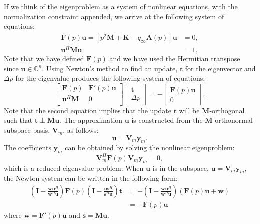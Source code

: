 \documentclass[12pt]{article}
\newcommand{\f}{\frac}
\newcommand{\mb}{\mathbf}
\begin{document}
If we think of the eigenproblem as a system of nonlinear equations,
with the normalization constraint appended, we arrive at the following
system of equations:
%
\begin{equation*}
  \begin{aligned}
    \mb{F}(p)\mb{u} = 
    \left[ p^{2} \mb{M} + \mb{K} - q_{\infty} \mb{A}(p) \right] \mb{u} & = 0, \\
    \mb{u}^{H} \mb{M} \mb{u} & = 1.
  \end{aligned}
\end{equation*}
Note that we have defined $\mb{F}(p)$ and we have used the Hermitian
transpose since $\mb{u} \in \mathbb{C}^{n}$. Using Newton's method
to find an update, $\mb{t}$ for the eigenvector and $\Delta p$ for
the eigenvalue produces the following system of equations:
%
\begin{equation*}
  \begin{bmatrix} 
    \mb{F}(p) & \mb{F}'(p)\mb{u} \\
    \mb{u}^{H}\mb{M} & 0  \\
  \end{bmatrix}
  \begin{bmatrix}
    \mb{t} \\
    \Delta p
  \end{bmatrix}
  = -
  \begin{bmatrix}
    \mb{F}(p)\mb{u} \\
    0
  \end{bmatrix}.
\end{equation*}
Note that the second equation implies that the update $\mb{t}$ will be
$\mb{M}$-orthogonal such that $\mb{t} \perp \mb{M} \mb{u}$.  The
approximation $\mb{u}$ is constructed from the $\mb{M}$-orthonormal
subspace basis, $\mb{V}_{m}$, as follows:
%
\begin{equation*}
  \mb{u} = \mb{V}_{m} \mb{y}_{m}.
\end{equation*}
The coefficients $\mb{y}_{m}$ can be obtained by solving the nonlinear
eigenproblem:
%
\begin{equation*}
  \mb{V}_{m}^{H} \mb{F}(p) \mb{V}_{m} \mb{y}_{m} = 0,
\end{equation*}
which is a reduced eigenvalue problem. When $\mb{u}$ is in the
subspace, $\mb{u} = \mb{V}_{m} \mb{y}_{m}$, the Newton system can be
written in the following form:
%
\begin{equation*}
  \begin{aligned}
    \left(\mb{I} - \f{\mb{w}\mb{u}^{H}}{\mb{w}^{H}\mb{u}} \right)
    \mb{F}(p) \left(\mb{I} - \f{\mb{u}\mb{s}^{H}}{\mb{s}^{H} \mb{u}} \right) \mb{t} & =
    - \left(\mb{I} - \f{\mb{w}\mb{u}^{H}}{\mb{w}^{H}\mb{u}} \right) (\mb{F}(p)\mb{u} + \mb{w}) \\
    & = - \mb{F}(p)\mb{u}
  \end{aligned}
\end{equation*}
where $\mb{w} = \mb{F}'(p) \mb{u}$ and $\mb{s} = \mb{M} \mb{u}$.
\end{document}
